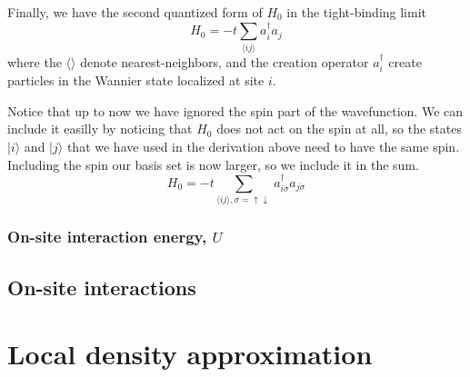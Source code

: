 \documentclass[11pt,letter]{article}
\newcommand{\dbl}{\ensuremath{ \uparrow\! \downarrow \, }}
\begin{document}
Finally, we have the second quantized form of $H_{0}$ in the tight-binding limit
\begin{equation}
  H_{0} = -t \sum_{ \langle ij \rangle } a_{i}^{\dagger}a_{j} 
\end{equation}
where the $\langle \rangle$ denote nearest-neighbors, and the creation operator $a_{i}^{\dagger}$ create particles in the Wannier state localized at site $i$.

Notice that up to now we have ignored the spin part of the wavefunction.   We
can include it easilly by noticing that $H_{0}$ does not act on the spin at
all, so the states $|i\rangle$ and $|j\rangle$ that we have used in the
derivation above need to have the same spin.   Including the spin our basis set
is now larger, so we include it in the sum.   
\begin{equation}
  H_{0} = -t \sum_{ \langle ij \rangle, \sigma=\dbl   } a_{i\sigma}^{\dagger}a_{j\sigma} 
\end{equation}

\subsubsection{On-site interaction energy, $U$}
 

\subsection{On-site interactions} 

\section{Local density approximation }



 



\end{document}
